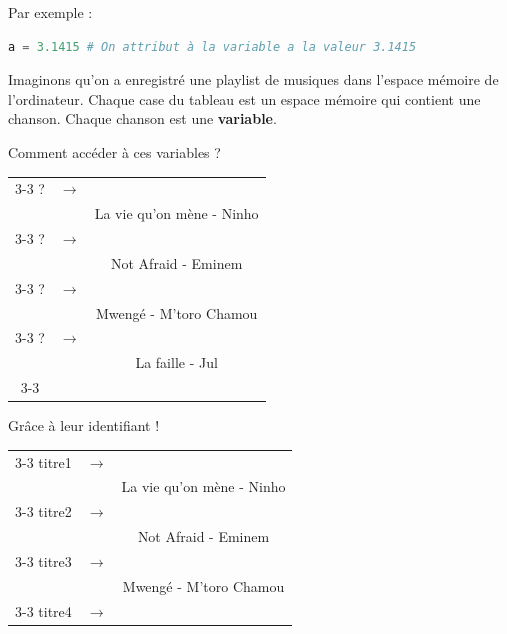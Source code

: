 Par exemple :
\begin{lstlisting}[style=pythonstyle, language=Python]
a = 3.1415 # On attribut à la variable a la valeur 3.1415
\end{lstlisting}
\vspace{-0.8cm}
\begin{Comprendre}
Imaginons qu'on a enregistré une playlist de musiques dans l'espace mémoire de l'ordinateur. Chaque case du tableau est un espace mémoire qui contient une chanson. Chaque chanson est une \textbf{variable}.\\[0.5cm]
\begin{minipage}{0.49\textwidth}
\centering
    Comment accéder à ces variables ? \\
    \begin{tabular}{c c |c|}
    \cline{3-3}
        ? & $\mathbf{\rightarrow}$ & \large \\
         & &La vie qu'on mène - Ninho\\
         \cline{3-3}
        ? & $\mathbf{\rightarrow}$ & \large \\
          & & Not Afraid - Eminem\\
          \cline{3-3}
        ? & $\mathbf{\rightarrow}$ & \large \\
          & & Mwengé - M'toro Chamou\\
          \cline{3-3}
        ? & $\mathbf{\rightarrow}$ & \large \\
           & & La faille - Jul\\
           \cline{3-3}
    \end{tabular} 
\end{minipage}\hfill\begin{minipage}{0.49\textwidth}
 \centering   
 Grâce à leur identifiant !\\
    \begin{tabular}{c c |c|}
    \cline{3-3}
        titre1 & $\mathbf{\rightarrow}$ & \large \\
         & &La vie qu'on mène - Ninho\\
         \cline{3-3}
        titre2 & $\mathbf{\rightarrow}$ & \large \\
          & & Not Afraid - Eminem\\
          \cline{3-3}
        titre3 & $\mathbf{\rightarrow}$ & \large \\
          & & Mwengé - M'toro Chamou\\
          \cline{3-3}
        titre4 & $\mathbf{\rightarrow}$ & \large \\

\end{tabular}
\end{minipage}
\end{Comprendre}
